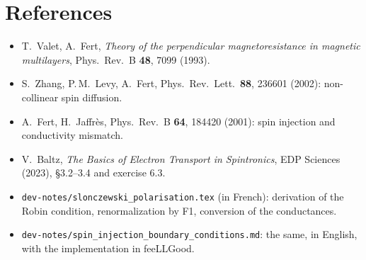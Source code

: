 \documentclass[11pt,a4paper]{article}
\begin{document}
\section*{References}

\begin{itemize}
  \item T.~Valet, A.~Fert, \emph{Theory of the perpendicular
    magnetoresistance in magnetic multilayers}, Phys.\ Rev.\ B
    \textbf{48}, 7099 (1993).
  \item S.~Zhang, P.\,M.~Levy, A.~Fert, Phys.\ Rev.\ Lett.\ \textbf{88},
    236601 (2002): non-collinear spin diffusion.
  \item A.~Fert, H.~Jaffrès, Phys.\ Rev.\ B \textbf{64}, 184420 (2001):
    spin injection and conductivity mismatch.
  \item V.~Baltz, \emph{The Basics of Electron Transport in Spintronics},
    EDP Sciences (2023), §3.2--3.4 and exercise 6.3.
  \item \texttt{dev-notes/slonczewski\_polarisation.tex} (in French):
    derivation of the Robin condition, renormalization by F1, conversion
    of the conductances.
  \item \texttt{dev-notes/spin\_injection\_boundary\_conditions.md}: the
    same, in English, with the implementation in feeLLGood.
\end{itemize}
\end{document}
